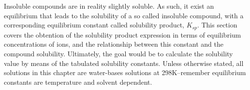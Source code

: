 \documentclass[main.tex]{subfiles}
\begin{document}
\section{\color{blue!30!black}{Solubility equilibrium and solubility product}}
Insoluble compounds are in reality slightly soluble. As such, it exist an equilibrium that leads to the solubility of a so called insoluble compound, with a corresponding equilibrium constant called solubility product, $K_{sp}$. This section covers the obtention of the solubility product expression in terms of equilibrium concentrations of ions, and the relationship between this constant and the compound solubility. Ultimately, the goal would be to calculate the solubility value by means of the tabulated solubility constants. Unless otherwise stated, all solutions in this chapter are water-bases solutions at 298K--remember equilibrium constants are temperature and solvent dependent.
\sloppy
\end{document}
